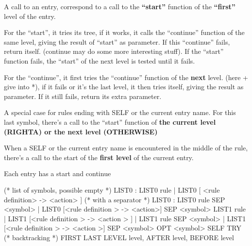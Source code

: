 \begin{enumerate}[(a)]
  A call to an entry, correspond to a call to the \textbf{``start''} function of
  the \textbf{``first''} level of the entry.

  For the ``start'', it tries its tree, if it works, it calls the
  ``continue'' function of the same level, giving the result of ``start''
  as parameter. If this ``continue'' fails, return itself. (continue may
  do some more interesting stuff). If the ``start'' function fails, the
  ``start'' of the next level is tested until it fails. 


  For the ``continue'', it first tries the ``continue'' function of the
  \textbf{next} level. (here + give into *), if it fails or it's the
  last level, it then tries itself, giving the result as parameter. If
  it still fails, return its extra parameter.

  A special case for rules ending with SELF or the current entry
  name. For this last symbol, there's a call to the ``start'' function
  of \textbf{the current level (RIGHTA) or the next level (OTHERWISE)}

  When a SELF or the current entry name is encountered in the middle
  of the rule, there's a call to the start of the \textbf{first level} of the
  current entry.

  Each entry has a start and continue

\begin{ocamlcode}
(* list of symbols, possible empty *)
LIST0 : LIST0 rule | LIST0 [ <rule definition> -> <action> ]
(* with a separator *)
LIST0 : LIST0 rule SEP <symbol>
| LIST0 [<rule definition > -> <action>] SEP <symbol>
  LIST1 rule
| LIST1 [<rule definition > -> <action > ]
| LIST1 rule SEP <symbol>
| LIST1 [<rule definition > -> <action >] SEP <symbol>
OPT <symbol>
SELF
TRY (* backtracking *)
FIRST LAST LEVEL level, AFTER level, BEFORE level 
\end{ocamlcode}

\end{enumerate}

